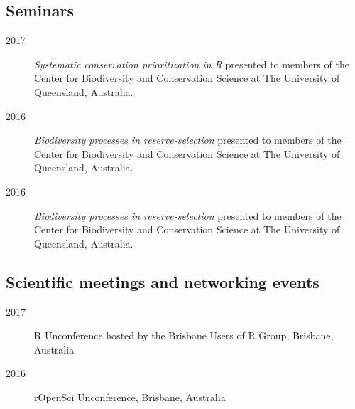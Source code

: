 \documentclass[12pt,a4paper]{article}
\begin{document}
\subsection*{Seminars}
\begin{description}

\item[2017] \textit{Systematic conservation prioritization in R} presented to members of the Center for Biodiversity and Conservation Science at The University of Queensland, Australia.

\item[2016] \textit{Biodiversity processes in reserve-selection} presented to members of the Center for Biodiversity and Conservation Science at The University of Queensland, Australia.

\item[2016] \textit{Biodiversity processes in reserve-selection} presented to members of the Center for Biodiversity and Conservation Science at The University of Queensland, Australia.

\end{description}

\subsection*{Scientific meetings and networking events}
\begin{description}

\item[2017] R Unconference hosted by the Brisbane Users of R Group, Brisbane, Australia

\item[2016] rOpenSci Unconference, Brisbane, Australia

\end{description}
\end{document}
